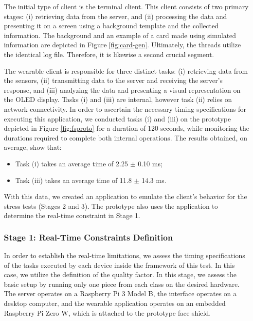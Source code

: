 The initial type of client is the terminal client. This client consists of two primary stages: (i) retrieving data from the server, and (ii) processing the data and presenting it on a screen using a background template and the collected information. The background and an example of a card made using simulated information are depicted in Figure \ref{fig:card-gen}. Ultimately, the threads utilize the identical log file. Therefore, it is likewise a second crucial segment.

The wearable client is responsible for three distinct tasks: (i) retrieving data from the sensors, (ii) transmitting data to the server and receiving the server's response, and (iii) analyzing the data and presenting a visual representation on the OLED display. Tasks (i) and (iii) are internal, however task (ii) relies on network connectivity. In order to ascertain the necessary timing specifications for executing this application, we conducted tasks (i) and (iii) on the prototype depicted in Figure \ref{fig:fsproto} for a duration of 120 seconds, while monitoring the durations required to complete both internal operations. The results obtained, on average, show that:

\begin{itemize}
    \item Task (i) takes an average time of 2.25 $\pm$ 0.10 ms;
    \item Task (iii) takes an average time of 11.8 $\pm$ 14.3 ms.
\end{itemize}

With this data, we created an application to emulate the client's behavior for the stress tests (Stages 2 and 3). The prototype also uses the application to determine the real-time constraint in Stage 1. 

\subsubsection{Stage 1: Real-Time Constraints Definition}

In order to establish the real-time limitations, we assess the timing specifications of the tasks executed by each device inside the framework of this test. In this case, we utilize the definition of the quality factor. In this stage, we assess the basic setup by running only one piece from each class on the desired hardware. The server operates on a Raspberry Pi 3 Model B, the interface operates on a desktop computer, and the wearable application operates on an embedded Raspberry Pi Zero W, which is attached to the prototype face shield.

